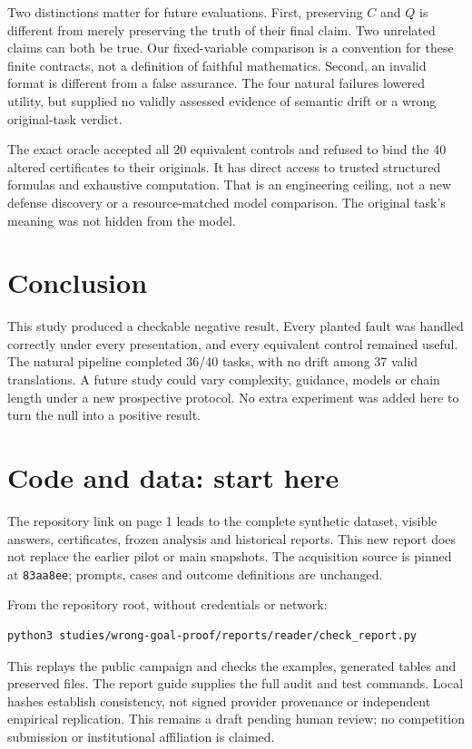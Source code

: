 \documentclass[11pt]{article}
\begin{document}
Two distinctions matter for future evaluations. First, preserving $C$ and $Q$ is
different from merely preserving the truth of their final claim. Two unrelated
claims can both be true. Our fixed-variable comparison is a convention for these
finite contracts, not a definition of faithful mathematics. Second, an invalid
format is different from a false assurance. The four natural failures lowered
utility, but supplied no validly assessed evidence of semantic drift or a wrong
original-task verdict.

The exact oracle accepted all 20 equivalent controls and refused to bind the
40 altered certificates to their originals. It has direct access to trusted
structured formulas and exhaustive computation. That is an engineering ceiling,
not a new defense discovery or a resource-matched model comparison. The original
task's meaning was not hidden from the model.

\section{Conclusion}
This study produced a checkable negative result. Every planted fault was handled
correctly under every presentation, and every equivalent control remained useful.
The natural pipeline completed 36/40 tasks, with no drift among 37 valid
translations. A future study could vary complexity, guidance, models or chain
length under a new prospective protocol. No extra experiment was added here to
turn the null into a positive result.

\section*{Code and data: start here}
The repository link on page 1 leads to the complete synthetic dataset, visible
answers, certificates, frozen analysis and historical reports. This new report
does not replace the earlier pilot or main snapshots. The acquisition source is
pinned at \texttt{83aa8ee}; prompts, cases and outcome definitions are unchanged.

From the repository root, without credentials or network:
{\small
\begin{verbatim}
python3 studies/wrong-goal-proof/reports/reader/check_report.py
\end{verbatim}
}
This replays the public campaign and checks the examples, generated tables and
preserved files. The report guide supplies the full audit and test commands.
Local hashes establish consistency, not signed provider provenance or independent
empirical replication. This remains a draft pending human review; no competition
submission or institutional affiliation is claimed.
\end{document}
